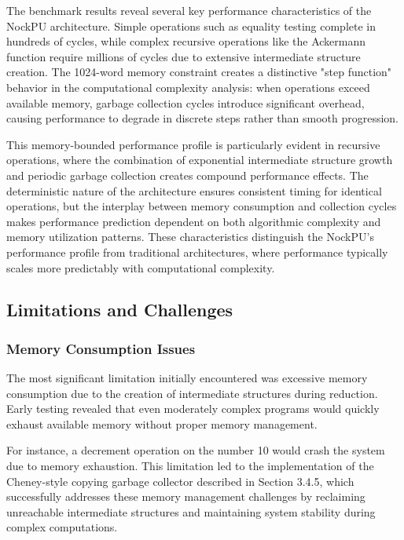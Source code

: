 \documentclass[twoside]{article}
\begin{document}
\noindent
The benchmark results reveal several key performance characteristics of the NockPU architecture. Simple operations such as equality testing complete in hundreds of cycles, while complex recursive operations like the Ackermann function require millions of cycles due to extensive intermediate structure creation. The 1024-word memory constraint creates a distinctive "step function" behavior in the computational complexity analysis: when operations exceed available memory, garbage collection cycles introduce significant overhead, causing performance to degrade in discrete steps rather than smooth progression.

This memory-bounded performance profile is particularly evident in recursive operations, where the combination of exponential intermediate structure growth and periodic garbage collection creates compound performance effects. The deterministic nature of the architecture ensures consistent timing for identical operations, but the interplay between memory consumption and collection cycles makes performance prediction dependent on both algorithmic complexity and memory utilization patterns. These characteristics distinguish the NockPU's performance profile from traditional architectures, where performance typically scales more predictably with computational complexity.

\subsection{Limitations and Challenges}

\subsubsection{Memory Consumption Issues}

The most significant limitation initially encountered was excessive memory consumption due to the creation of intermediate structures during reduction. Early testing revealed that even moderately complex programs would quickly exhaust available memory without proper memory management.

For instance, a decrement operation on the number 10 would crash the system due to memory exhaustion. This limitation led to the implementation of the Cheney-style copying garbage collector described in Section 3.4.5, which successfully addresses these memory management challenges by reclaiming unreachable intermediate structures and maintaining system stability during complex computations.
\end{document}
